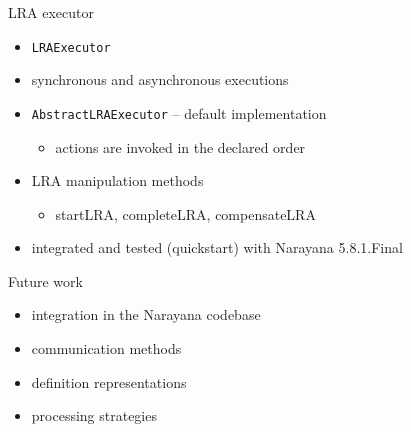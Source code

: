\documentclass{beamer}
\begin{document}
\begin{frame}{LRA executor}

\begin{itemize}
    \item \texttt{LRAExecutor}
    \item synchronous and asynchronous executions
    \item \texttt{AbstractLRAExecutor} -- default implementation
    \begin{itemize}
        \item actions are invoked in the declared order
    \end{itemize}
    \item LRA manipulation methods
    \begin{itemize}
        \item startLRA, completeLRA, compensateLRA
    \end{itemize}
    \item integrated and tested (quickstart) with Narayana 5.8.1.Final
\end{itemize}


\end{frame}

\begin{frame}{Future work}

\begin{itemize}
    \item integration in the Narayana codebase
    \item communication methods 
    \item definition representations
    \item processing strategies
\end{itemize}


\end{frame}
\end{document}
